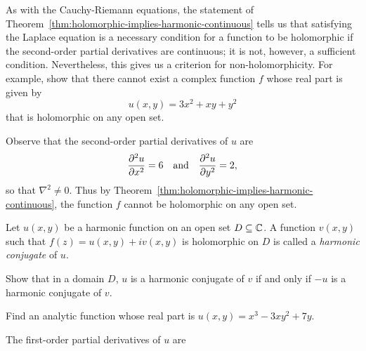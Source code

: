 \begin{example}
    As with the Cauchy-Riemann equations, the statement of Theorem~\ref{thm:holomorphic-implies-harmonic-continuous} tells us that satisfying the Laplace equation is a necessary condition for a function to be holomorphic if the second-order partial derivatives are continuous; it is not, however, a sufficient condition. Nevertheless, this gives us a criterion for non-holomorphicity. For example, show that there cannot exist a complex function \(f\) whose real part is given by
    \[
        u(x, y) = 3x^2 + xy + y^2
    \]
    that is holomorphic on any open set.

    \begin{solution}
        Observe that the second-order partial derivatives of \(u\) are
        \[
            \frac{\partial ^2u}{\partial x^2} = 6 \quad \text{and} \quad \frac{\partial ^2u}{\partial y^2} = 2,
        \]
        so that \(\nabla^2 \neq 0\). Thus by Theorem~\ref{thm:holomorphic-implies-harmonic-continuous}, the function \(f\) cannot be holomorphic on any open set.
    \end{solution}
\end{example}

\begin{definition}
    Let \(u(x, y)\) be a harmonic function on an open set \(D \subseteq \mathbb{C}\). A function \(v(x, y)\) such that \(f(z) = u(x, y) + iv(x, y)\) is holomorphic on \(D\) is called a \emph{harmonic conjugate} of \(u\).
\end{definition}

\begin{example}
    Show that in a domain \(D\), \(u\) is a harmonic conjugate of \(v\) if and only if \(-u\) is a harmonic conjugate of \(v\).
\end{example}

\begin{example}
    Find an analytic function whose real part is \(u(x, y) = x^3 - 3xy^2 + 7y\).

    \begin{solution}
        The first-order partial derivatives of \(u\) are
    \end{solution}
\end{example}

